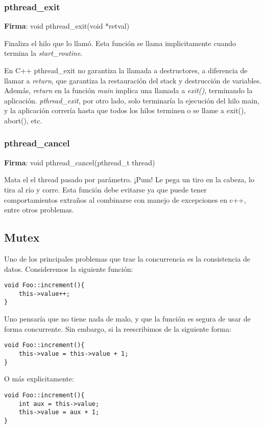 \documentclass[a4paper, twoside]{article}
\begin{document}
\subsubsection{pthread\_exit}
\textbf{Firma}: void pthread\_exit(void *retval)\par
Finaliza el hilo que lo llamó. Esta función se llama implicitamente cuando termina la \emph{start\_routine}.

En C++ pthread\_exit no garantiza la llamada a destructores, a diferencia de llamar a \emph{return}, que garantiza la restauración del stack y destrucción de variables. Además, \emph{return} en la función \emph{main} implica una llamada a \emph{exit()}, terminando la aplicación. \emph{pthread\_exit}, por otro lado, solo terminaría la ejecución del hilo main, y la aplicación correría hasta que todos los hilos terminen o se llame a exit(), abort(), etc.

\subsubsection{pthread\_cancel}
\textbf{Firma}: void pthread\_cancel(pthread\_t thread)\par
Mata el el thread pasado por parámetro. ¡Pum! Le pega un tiro en la cabeza, lo tira al río y corre. Esta función debe evitarse ya que puede tener comportamientos extraños al combinarse con manejo de excepciones en c++, entre otros problemas.\\

\subsection{Mutex}
Uno de los principales problemas que trae la concurrencia es la consistencia de datos. Consideremos la siguiente función:

\begin{lstlisting}
void Foo::increment(){
	this->value++;
}
\end{lstlisting}

Uno pensaría que no tiene nada de malo, y que la función es segura de usar de forma concurrente. Sin embargo, si la reescribimos de la siguiente forma:

\begin{lstlisting}
void Foo::increment(){
	this->value = this->value + 1;
}
\end{lstlisting}

O más explicitamente:

\begin{lstlisting}
void Foo::increment(){
	int aux = this->value;
	this->value = aux + 1;
}
\end{lstlisting}
\end{document}
